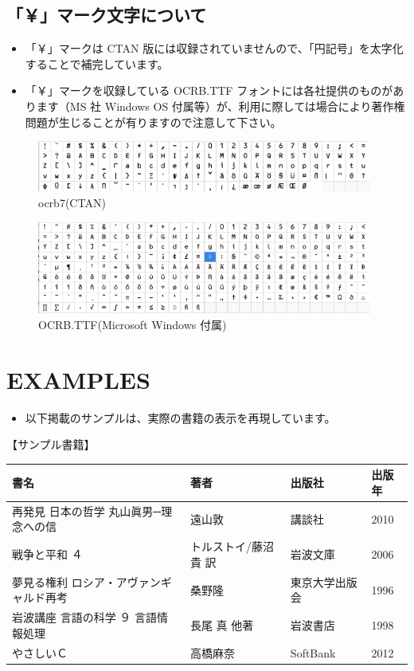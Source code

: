 \documentclass[a5j,tombo,10pt,titlepage,pdfusetitle]{ltjsbook}
\def\fs#1#2{\fontsize{#1}{#2}\selectfont }
\begin{document}
{\subsection{「￥」マーク文字について}\vspace{-2mm}
{\fs{9}{9}\begin{itemize}
  \item 「￥」マークは CTAN 版には収録されていませんので、「円記号」を太字化することで補完しています。
  \item 「￥」マークを収録している OCRB.TTF フォントには各社提供のものがあります（MS 社 Windows OS 付属等）が、利用に際しては場合により著作権問題が生じることが有りますので注意して下さい。

\end{itemize}
}

\begin{figure}[H]
\centering
\includegraphics[width=11cm]{./images/ocrb-ttf01.png}
\caption{ocrb7(CTAN)} 
\end{figure}
\begin{figure}[H]
\centering
\includegraphics[width=11cm]{./images/ocrb-ttf-ms2.png}
\caption{OCRB.TTF(Microsoft Windows 付属)} 
\end{figure}

\newpage
\thispagestyle{empty}

\section{EXAMPLES}   
\begin{itemize}
  \item 以下掲載のサンプルは、実際の書籍の表示を再現しています。
\end{itemize}

【サンプル書籍】
\begin{table}[H]\fs{8}{8}
\begin{tabular}{llll}
書名 & 著者 & 出版社 & 出版年\\ 
\hline
再発見 日本の哲学 丸山眞男─理念への信 & 遠山敦 & 講談社 & 2010\\ 
戦争と平和 ４ & トルストイ/藤沼 貴 訳 & 岩波文庫 & 2006\\ 
夢見る権利 ロシア・アヴァンギャルド再考 & 桑野隆 & 東京大学出版会 & 1996\\ 
岩波講座 言語の科学 ９ 言語情報処理 & 長尾 真 他著 & 岩波書店 & 1998\\ 
やさしいＣ & 高橋麻奈 & SoftBank & 2012\\ 
\end{tabular}
\end{table}

}
\end{document}
